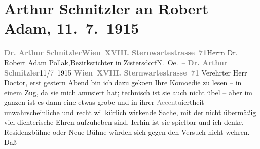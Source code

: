 

         
         \newcommand{\erwaehntePersonen}{Personen: Robert Adam}
         \newcommand{\erwaehnteInstitutionen}{}
         \newcommand{\erwaehnteOrte}{Orte: Kammerspiele Wien, Neue Wiener Bühne, Niederösterreich, Sternwartestraße, Wien, Zistersdorf}
         \newcommand{\erwaehnteWerke}{Werke: Gesellschaft [Eine Gaunerkomödie]}
               \section[Arthur Schnitzler an Robert Adam, 11. 7. 1915]{ Arthur Schnitzler an Robert Adam, 11. 7. 1915}\nopagebreak{}\rehead{ }\begin{ledgroupsized}[t]{13cm}\normalsize\beginnumbering \toendnotes[C]{\smallbreak\pagebreak[2]} 
\toendnotes[C]{\smallbreak}\pstart{}{\pb}\textcolor{gray}{\textbf{Dr. Arthur Schnitzler}}\pend{}\pstart{}\textcolor{gray}{\textbf{Wien XVIII. Sternwartestrasse 71}}\pend{}{\bigskip}\pstart{}{\pb}Herrn Dr. Robert Adam
                        Pollak,\pend{}\pstart{}Bezirksrichter in Zistersdorf\pend{}\pstart{}N. Oe. –
                    \pend{}{\bigskip}\pstart
           \noindent{}{\pb}\textcolor{gray}{\textbf{Dr. Arthur Schnitzler}}\hfill 11/7 1915\pend
           \pstart
           \textcolor{gray}{\textbf{Wien XVIII. Sternwartestrasse 71}}\pend
           \pstart
           Verehrter Herr Doctor, erst gestern Abend bin ich dazu geko{\geminationm}en Ihre Komoedie zu lesen – in einem Zug, da sie mich
                    amusiert hat; technisch ist sie auch nicht übel – aber im ganzen ist es dann
                    eine etwas grobe und in ihrer \textcolor{gray}{Accentu}iertheit
                    unwahrscheinliche und recht willkürlich wirkende Sache, mit der nicht übermäßig
                        \introOben{}viel\introOben{} dichterische Ehren aufzuheben sind. I{\geminationm}erhin ist sie spielbar und ich denke, Residenzbühne oder Neue Bühne würden sich gegen den Versuch nicht wehren. Daß

\end{ledgroupsized}
